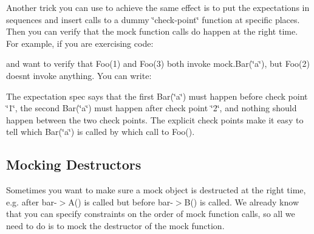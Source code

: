 Another trick you can use to achieve the same effect is to put the expectations in sequences and insert calls to a dummy \char`\"{}check-\/point\char`\"{} function at specific places. Then you can verify that the mock function calls do happen at the right time. For example, if you are exercising code\+:


\begin{DoxyCode}{0}
\end{DoxyCode}


and want to verify that {\ttfamily Foo(1)} and {\ttfamily Foo(3)} both invoke {\ttfamily mock.\+Bar(\char`\"{}a\char`\"{})}, but {\ttfamily Foo(2)} doesn\textquotesingle{}t invoke anything. You can write\+:


\begin{DoxyCode}{0}
\DoxyCodeLine{}
\DoxyCodeLine{  \{}
\DoxyCodeLine{}
\DoxyCodeLine{  \}}
\DoxyCodeLine{\}}
\end{DoxyCode}


The expectation spec says that the first {\ttfamily Bar(\char`\"{}a\char`\"{})} must happen before check point \char`\"{}1\char`\"{}, the second {\ttfamily Bar(\char`\"{}a\char`\"{})} must happen after check point \char`\"{}2\char`\"{}, and nothing should happen between the two check points. The explicit check points make it easy to tell which {\ttfamily Bar(\char`\"{}a\char`\"{})} is called by which call to {\ttfamily Foo()}.

\subsection*{Mocking Destructors}

Sometimes you want to make sure a mock object is destructed at the right time, e.\+g. after {\ttfamily bar-\/$>$A()} is called but before {\ttfamily bar-\/$>$B()} is called. We already know that you can specify constraints on the order of mock function calls, so all we need to do is to mock the destructor of the mock function.

